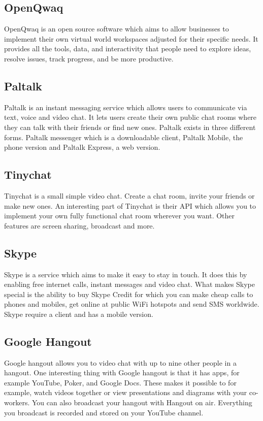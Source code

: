 \documentclass[12pt, titlepage]{article}
\begin{document}
\subsection{OpenQwaq}
OpenQwaq\cite{15} is an open source software which aims to allow businesses to implement their own virtual world workspaces adjusted for their specific needs. It provides all the tools, data, and interactivity that people need to explore ideas, resolve issues, track progress, and be more productive.
\subsection{Paltalk}
Paltalk\cite{16} is an instant messaging service which allows users to communicate via text, voice and video chat. It lets users create their own public chat rooms where they can talk with their friends or find new ones. Paltalk exists in three different forms. Paltalk messenger which is a downloadable client, Paltalk Mobile, the phone version and Paltalk Express, a web version.
\subsection{Tinychat}
Tinychat\cite{17} is a small simple video chat. Create a chat room, invite your friends or make new ones. An interesting part of Tinychat is their API which allows you to implement your own fully functional chat room wherever you want. Other features are screen sharing, broadcast and more.
\subsection{Skype}
Skype\cite{3} is a service which aims to make it easy to stay in touch. It does this by enabling free internet calls, instant messages and video chat. What makes Skype special is the ability to buy Skype Credit for which you can make cheap calls to phones and mobiles, get online at public WiFi hotspots and send SMS worldwide. Skype require a client and has a mobile version.
\subsection{Google Hangout}
Google hangout\cite{2} allows you to video chat with up to nine other people in a hangout. One interesting thing with Google hangout is that it has apps, for example YouTube, Poker, and Google Docs. These makes it possible to for example, watch videos together or view presentations and diagrams with your co-workers. You can also broadcast your hangout with Hangout on air. Everything you broadcast is recorded and stored on your YouTube channel.
\end{document}
